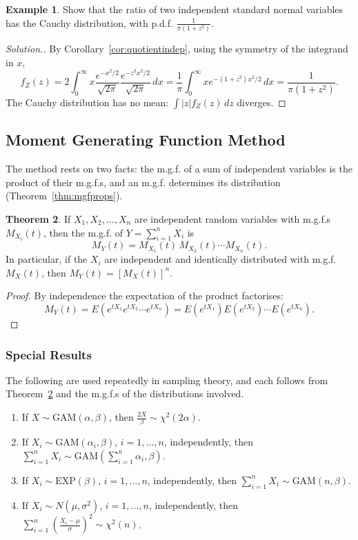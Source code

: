 \documentclass[12pt,a4paper]{report}
\theoremstyle{definition}
\newtheorem{thm}{Theorem}[section]
\newtheorem{example}[thm]{Example}
\theoremstyle{plain}
\newenvironment{solution}
  {\renewcommand{\qedsymbol}{}\begin{proof}[\textit{Solution}.]}
  {\end{proof}}
\begin{document}
\begin{example}
\label{ex:cauchy}
Show that the ratio of two independent standard normal variables has the Cauchy
distribution, with p.d.f. $\frac{1}{\pi(1 + z^2)}$.
\end{example}

\begin{solution}
By Corollary~\ref{cor:quotientindep}, using the symmetry of the integrand in $x$,
\[f_Z(z) = 2\int_0^\infty x\frac{e^{-x^2/2}}{\sqrt{2\pi}}\frac{e^{-z^2x^2/2}}
{\sqrt{2\pi}}\,dx = \frac{1}{\pi}\int_0^\infty xe^{-(1 + z^2)x^2/2}\,dx =
\frac{1}{\pi(1 + z^2)} .\]
The Cauchy distribution has no mean: $\int|z|f_Z(z)\,dz$ diverges.
\end{solution}

\subsection{Moment Generating Function Method}

The method rests on two facts: the m.g.f. of a sum of independent variables is
the product of their m.g.f.s, and an m.g.f. determines its distribution
(Theorem~\ref{thm:mgfprops}).

\begin{thm}
\label{thm:mgfsum}
If $X_1, X_2, \dots, X_n$ are independent random variables with m.g.f.s
$M_{X_i}(t)$, then the m.g.f. of $Y = \sum^n_{i = 1}X_i$ is
\[M_{Y}(t) = M_{X_1}(t)\, M_{X_2}(t)\cdots M_{X_n}(t) .\]
In particular, if the $X_i$ are independent and identically distributed with
m.g.f. $M_X(t)$, then $M_Y(t) = [M_X(t)]^n$.
\end{thm}

\begin{proof}
By independence the expectation of the product factorises:
\[M_Y(t) = E\left(e^{tX_1}e^{tX_2}\cdots e^{tX_n}\right) =
E\left(e^{tX_1}\right) E\left(e^{tX_2}\right) \cdots E\left(e^{tX_n}\right) .\]
\end{proof}

\subsubsection{Special Results}

The following are used repeatedly in sampling theory, and each follows from
Theorem~\ref{thm:mgfsum} and the m.g.f.s of the distributions involved.
\begin{enumerate}
\item If $X\sim \text{GAM}(\alpha,\beta)$, then
$\frac{2X}{\beta} \sim \chi^2(2\alpha)$.
\item If $X_i \sim \text{GAM}(\alpha_i,\beta)$, $i = 1, \dots, n$, independently,
then $\sum^n_{i = 1} X_i \sim\text{GAM}\left(\sum^n_{i = 1} \alpha_i,
\beta\right)$.
\item If $X_i \sim \text{EXP}(\beta)$, $i = 1, \dots , n$, independently, then
$\sum^n_{i = 1}X_i \sim \text{GAM}(n,\beta)$.
\item If $X_i \sim N(\mu,\sigma^2)$, $i = 1, \dots , n$, independently, then
$\sum^n_{i = 1}\left(\frac{X_i - \mu}{\sigma}\right)^2\sim \chi^2(n)$.
\end{enumerate}
\end{document}
